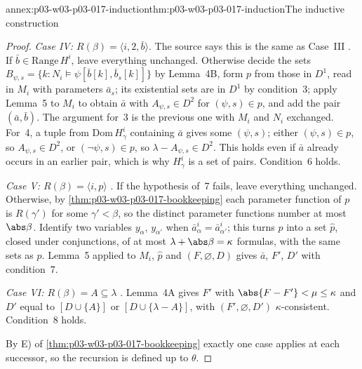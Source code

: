 \begin{annexitem}{annex:p03-w03-p03-017-induction}{thm:p03-w03-p03-017-induction}{The inductive construction}
\begin{proof}
\emph{Case IV: \(R(\beta)=\langle i,2,\bar b\rangle\)}.  The source says this
is the same as Case~III \cite[p.~232]{Shelah1971Ultrapowers}.  If
\(\bar b\in\mathrm{Range}\,H^i\), leave everything unchanged.  Otherwise
decide the sets \(B_{\psi,s}=\{k:N_i\models\psi[\bar b[k],\bar b_s[k]]\}\) by
Lemma~4B, form \(p\) from those in \(D^1\), read in \(M_i\) with parameters
\(\bar a_s\); its existential sets are in \(D^1\) by condition~3; apply
Lemma~5 to \(M_i\) to obtain \(\bar a\) with
\(A_{\psi,s}\in D^2\) for \((\psi,s)\in p\), and add the pair
\((\bar a,\bar b)\).  The argument for~3 is the previous one with \(M_i\)
and \(N_i\) exchanged.  For~4, a tuple from \(\mathrm{Dom}\,H^i_\gamma\)
containing \(\bar a\) gives some \((\psi,s)\); either \((\psi,s)\in p\), so
\(A_{\psi,s}\in D^2\), or \((\neg\psi,s)\in p\), so \(\lambda-A_{\psi,s}\in
D^2\).  This holds even if \(\bar a\) already occurs in an earlier pair,
which is why \(H^i_\gamma\) is a set of pairs.  Condition~6 holds.

\emph{Case V: \(R(\beta)=\langle i,p\rangle\)} \cite[p.~232]{Shelah1971Ultrapowers}.
If the hypothesis of~7 fails, leave everything unchanged.  Otherwise, by
\cref{thm:p03-w03-p03-017-bookkeeping} each parameter function of \(p\) is
\(R(\gamma')\) for some \(\gamma'<\beta\), so the distinct parameter
functions number at most \(\abs\beta\).  Identify two variables \(y_\alpha\),
\(y_{\alpha'}\) when \(\bar a^i_\alpha=\bar a^i_{\alpha'}\); this turns \(p\)
into a set \(\hat p\), closed under conjunctions, of at most
\(\lambda+\abs\beta=\kappa\) formulas, with the same sets as \(p\).  Lemma~5
applied to \(M_i\), \(\hat p\) and \((F,\varnothing,D)\) gives \(\bar a\),
\(F'\), \(D'\) with condition~7.

\emph{Case VI: \(R(\beta)=A\subseteq\lambda\)} \cite[p.~232]{Shelah1971Ultrapowers}.
Lemma~4A gives \(F'\) with \(\abs{F-F'}<\mu\le\kappa\) and \(D'\) equal to
\([D\cup\{A\}]\) or \([D\cup\{\lambda-A\}]\), with \((F',\varnothing,D')\)
\(\kappa\)-consistent.  Condition~8 holds.

By E) of \cref{thm:p03-w03-p03-017-bookkeeping} exactly one case applies at
each successor, so the recursion is defined up to \(\theta\).
\end{proof}
\end{annexitem}

